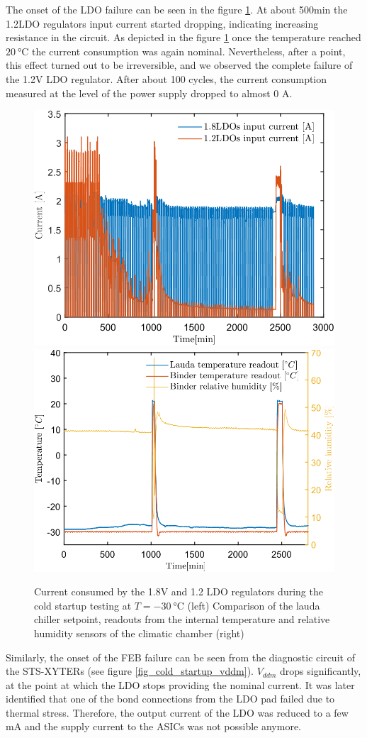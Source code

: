 The onset of the \gls{LDO} failure can be seen in the figure \ref{fig_cold_startup}. At about 500min the 1.2LDO regulators input current started dropping, indicating increasing resistance in the circuit. As depicted in the figure \ref{fig_cold_startup} once the temperature reached $\SI{20}{\celsius}$ the current consumption was again nominal. Nevertheless, after a point, this effect turned out to be irreversible, and we observed the complete failure of the 1.2V \gls{LDO} regulator. After about 100 cycles, the current consumption measured at the level of the power supply dropped to almost 0 A. 
\begin{figure}[!h]
\centering
\includegraphics[width=0.46\columnwidth]{Chapter4/images/currents_long.png}
\includegraphics[width=0.48\columnwidth]{Chapter4/images/cycling.png}
\caption{Current consumed by the 1.8V and 1.2 \gls{LDO} regulators during the cold startup testing at $T = \SI{-30}{\celsius}$ (left)
Comparison of the lauda chiller setpoint, readouts from the internal temperature and relative humidity sensors of the climatic chamber (right)}
\label{fig_cold_startup}
\end{figure}

Similarly, the onset of the \gls{FEB} failure can be seen from the diagnostic circuit of the \gls{STS}-XYTERs (see figure \ref{fig_cold_startup_vddm}). $V_{ddm}$ drops significantly, at the point at which the \gls{LDO} stops providing the nominal current. It was later identified that one of the bond connections from the \gls{LDO} pad failed due to thermal stress. Therefore, the output current of the \gls{LDO} was reduced to a few mA and the supply current to the \glspl{ASIC} was not possible anymore.

